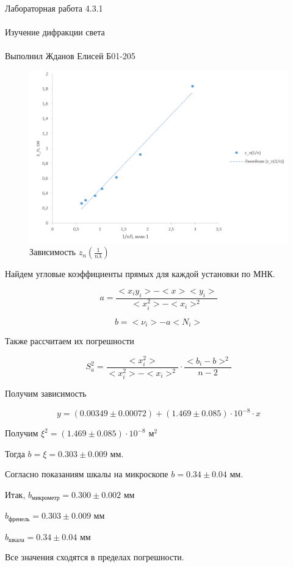 \documentclass{astroedu-lab}
\begin{document}
\begin{problem}{\huge Лабораторная работа 4.3.1\\\\Изучение дифракции света\\\\Выполнил Жданов Елисей Б01-205}
\begin{figure}[H]
	\centering
	\includegraphics[scale=0.45]{gr1.png}
	\caption{Зависимость $z_n(\frac{1}{n \lambda})$}
	\label{labG}
\end{figure}





Найдем угловые коэффициенты прямых для каждой установки по МНК.

\[
	a = \frac{<x_i y_i> - < x > < y_i >}{< x_i^2> - < x_i >^2}
\]

\[
	b = < \nu_i > - a < N_i >
\]

Также рассчитаем их погрешности

\begin{equation}
	S_a^2 = \frac{< x_i^2>}{< x_i^2 > - < x_i >^2} \cdot \frac{<  b_i - b > ^2}{n - 2}
\end{equation}

Получим зависимость

\begin{equation}
	y = (0.00349 \pm 0.00072) + (1.469 \pm 0.085) \cdot 10^{-8} \cdot x
\end{equation}

Получим $\xi^2 = (1.469 \pm 0.085) \cdot 10^{-8}$ м$^2$

Тогда $b = \xi = 0.303 \pm 0.009$ мм.

Согласно показаниям шкалы на микроскопе $b = 0.34 \pm 0.04$ мм.

Итак, $b_\text{микрометр} = 0.300 \pm 0.002$ мм

$b_\text{френель} = 0.303 \pm 0.009$ мм

$b_\text{шкала} = 0.34 \pm 0.04$ мм

Все значения сходятся в пределах погрешности.


\end{problem}
\end{document}

